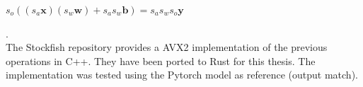 \vspace{1cm}
$s_o ((s_a \bm{x}) (s_w \bm{w}) + s_a s_w \bm{b}) = s_a s_w s_o \bm{y}$

. \\

The Stockfish repository provides a AVX2 implementation of the previous operations in C++. They have been ported to Rust for this thesis. The implementation was tested using the Pytorch model as reference (output match).


